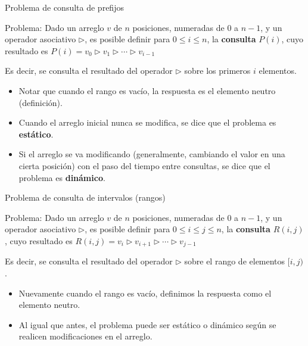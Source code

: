 \documentclass{beamer}
\begin{document}
\begin{frame}{Problema de consulta de prefijos}
    \begin{block}{Problema:}
    Dado un arreglo $v$ de $n$ posiciones, numeradas de $0$ a $n-1$, y un operador asociativo $\triangleright$, es posible definir
     para $0 \leq i \leq n$, la \textbf{consulta} $P(i)$, cuyo resultado es $P(i) = v_0 \triangleright v_1 \triangleright \cdots \triangleright v_{i-1}$
  \end{block}
  Es decir, se consulta el resultado del operador $\triangleright$ sobre los primeros $i$ elementos.
  \pause
  
  \begin{itemize}
  \item Notar que cuando el rango es vacío, la respuesta es el elemento neutro (definición).
  \item Cuando el arreglo inicial nunca se modifica, se dice que el problema es \textbf{estático}.
  \item Si el arreglo se va modificando (generalmente, cambiando el valor en una cierta posición) con el paso del tiempo entre consultas, se dice que el problema es \textbf{dinámico}.
  \end{itemize}
  
\end{frame}

\begin{frame}{Problema de consulta de intervalos (rangos)}
    \begin{block}{Problema:}
    Dado un arreglo $v$ de $n$ posiciones, numeradas de $0$ a $n-1$, y un operador asociativo $\triangleright$, es posible definir
     para $0 \leq i \leq j \leq n$, la \textbf{consulta} $R(i,j)$, cuyo resultado es $R(i,j) = v_i \triangleright v_{i+1} \triangleright \cdots \triangleright v_{j-1}$
  \end{block}
  Es decir, se consulta el resultado del operador $\triangleright$ sobre el rango de elementos $[i,j)$.
  \pause
  
  \begin{itemize}
  \item Nuevamente cuando el rango es vacío, definimos la respuesta como el elemento neutro.
  \item Al igual que antes, el problema puede ser estático o dinámico según se realicen modificaciones en el arreglo.
  \end{itemize}
  
\end{frame}
\end{document}
